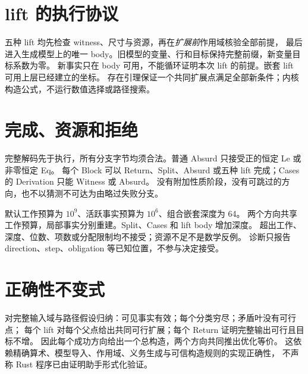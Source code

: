 \section{lift 的执行协议}
\label{sec:lift-execution}
五种 lift 均先检查 witness、尺寸与资源，再在\emph{扩展前}作用域核验全部前提，
最后进入生成模型上的唯一 body。旧模型的变量、行和目标保持完整前缀，新变量目标系数为零。
新事实只在 body 可用，不能循环证明本次 lift 的前提。嵌套 lift 可用上层已经建立的坐标。
存在引理保证一个共同扩展点满足全部新条件；内核构造公式，不运行数值选择或路径搜索。

\section{完成、资源和拒绝}
完整解码先于执行，所有分支字节均须合法。普通 Absurd 只接受正的恒定 Le 或非零恒定 Eq。
每个 Block 可以 Return、Split、Absurd 或五种 lift 完成；Cases 的 Derivation 只能 Witness 或 Absurd。
没有附加性质阶段，没有可跳过的方向，也不以猜测不可达为由略过失败分支。

默认工作预算为 $10^9$、活跃事实预算为 $10^6$、组合嵌套深度为 64。
两个方向共享工作预算，局部事实分别重建。Split、Cases 和 lift body 增加深度。
超出工作、深度、位数、项数或分配限制均不接受；资源不足不是数学反例。
诊断只报告 direction、step、obligation 等已知位置，不参与决定接受。

\section{正确性不变式}
\label{sec:soundness-invariants}
对完整输入域与路径假设归纳：可见事实有效；每个分类穷尽；矛盾叶没有可行点；
每个 lift 对每个父点给出共同可行扩展；每个 Return 证明完整输出可行且目标不增。
因此每个成功方向给出一个总构造，两个方向共同推出优化等价。
这依赖精确算术、模型导入、作用域、义务生成与可信构造规则的实现正确性，
不声称 Rust 程序已由证明助手形式化验证。
